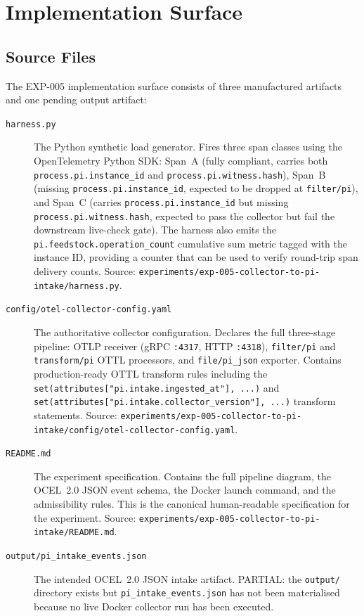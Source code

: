\section{Implementation Surface}
\label{sec:otel-weaver-exp-005-collector-to-intake-implementation}

\subsection{Source Files}
\label{sec:otel-weaver-exp-005-collector-to-intake-implementation-sources}

The EXP-005 implementation surface consists of three manufactured artifacts and one pending
output artifact:

\begin{description}
  \item[\texttt{harness.py}] The Python synthetic load generator. Fires three span classes
        using the OpenTelemetry Python SDK: Span~A (fully compliant, carries both
        \texttt{process.pi.instance\_id} and \texttt{process.pi.witness.hash}), Span~B
        (missing \texttt{process.pi.instance\_id}, expected to be dropped at \texttt{filter/pi}),
        and Span~C (carries \texttt{process.pi.instance\_id} but missing
        \texttt{process.pi.witness.hash}, expected to pass the collector but fail the
        downstream live-check gate). The harness also emits the
        \texttt{pi.feedstock.operation\_count} cumulative sum metric tagged with the instance
        ID, providing a counter that can be used to verify round-trip span delivery counts.
        Source: \texttt{experiments/exp-005-collector-to-pi-intake/harness.py}.

  \item[\texttt{config/otel-collector-config.yaml}] The authoritative collector configuration.
        Declares the full three-stage pipeline: OTLP receiver (gRPC \texttt{:4317}, HTTP
        \texttt{:4318}), \texttt{filter/pi} and \texttt{transform/pi} OTTL processors, and
        \texttt{file/pi\_json} exporter. Contains production-ready OTTL transform rules
        including the \texttt{set(attributes["pi.intake.ingested\_at"], ...)} and
        \texttt{set(attributes["pi.intake.collector\_version"], ...)} transform statements.
        Source: \texttt{experiments/exp-005-collector-to-pi-intake/config/otel-collector-config.yaml}.

  \item[\texttt{README.md}] The experiment specification. Contains the full pipeline diagram,
        the OCEL~2.0 JSON event schema, the Docker launch command, and the admissibility rules.
        This is the canonical human-readable specification for the experiment.
        Source: \texttt{experiments/exp-005-collector-to-pi-intake/README.md}.

  \item[\texttt{output/pi\_intake\_events.json}] The intended OCEL~2.0 JSON intake artifact.
        PARTIAL: the \texttt{output/} directory exists but \texttt{pi\_intake\_events.json}
        has not been materialised because no live Docker collector run has been executed.
\end{description}


